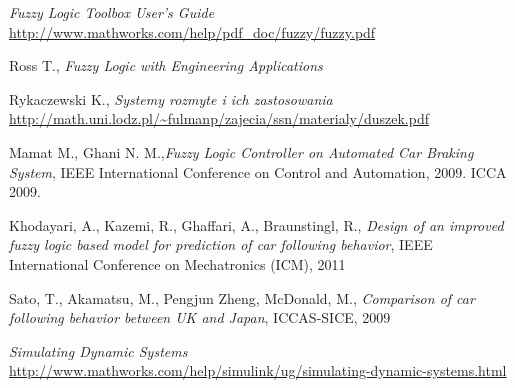 \documentclass[11pt,a4paper]{article}
\begin{document}
\begin{thebibliography}{9}
	\emph{Fuzzy Logic Toolbox User’s Guide}\\
	\url{http://www.mathworks.com/help/pdf_doc/fuzzy/fuzzy.pdf}

	Ross T., \emph{Fuzzy Logic with Engineering Applications}

	Rykaczewski K., \emph{Systemy rozmyte i ich zastosowania}\\
	\url{http://math.uni.lodz.pl/~fulmanp/zajecia/ssn/materialy/duszek.pdf}

	Mamat M., Ghani N. M.,\emph{Fuzzy Logic Controller on Automated Car Braking System}, IEEE International Conference on Control and Automation, 2009. ICCA 2009. 

	Khodayari, A., Kazemi, R., Ghaffari, A., Braunstingl, R., \emph{Design of an improved fuzzy logic based model for prediction of car following behavior}, IEEE International Conference on Mechatronics (ICM), 2011 

	Sato, T., Akamatsu, M., Pengjun Zheng, McDonald, M., \emph{Comparison of car following behavior between UK and Japan}, ICCAS-SICE, 2009
	
	\emph{Simulating Dynamic Systems}\\
	\url{http://www.mathworks.com/help/simulink/ug/simulating-dynamic-systems.html}
\end{thebibliography}
\end{document}
